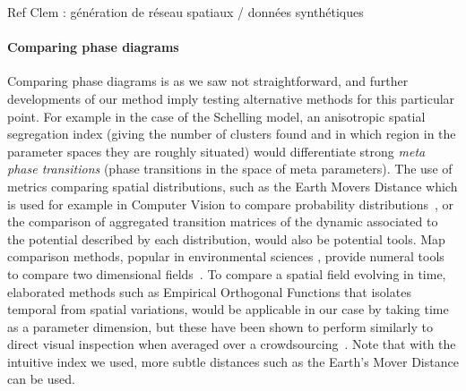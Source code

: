 \documentclass[Royal,sageh,times]{sagej}
\begin{document}




Ref Clem : \cite{alizadeh2016generating} génération de réseau spatiaux / données synthétiques

\paragraph{Comparing phase diagrams}

Comparing phase diagrams is as we saw not straightforward, and further developments of our method imply testing alternative methods for this particular point. For example in the case of the Schelling model, an anisotropic spatial segregation index (giving the number of clusters found and in which region in the parameter spaces they are roughly situated) would differentiate strong \emph{meta phase transitions} (phase transitions in the space of meta parameters). The use of metrics comparing spatial distributions, such as the Earth Movers Distance which is used for example in Computer Vision to compare probability distributions~\cite{rubner2000earth}, or the comparison of aggregated transition matrices of the dynamic associated to the potential described by each distribution, would also be potential tools. Map comparison methods, popular in environmental sciences , provide numeral tools to compare two dimensional fields~\cite{visser2006map}. To compare a spatial field evolving in time, elaborated methods such as Empirical Orthogonal Functions that isolates temporal from spatial variations, would be applicable in our case by taking time as a parameter dimension, but these have been shown to perform similarly to direct visual inspection when averaged over a crowdsourcing~\cite{10.1371/journal.pone.0178165}. Note that with the intuitive index we used, more subtle distances such as the Earth's Mover Distance can be used.



\end{document}

